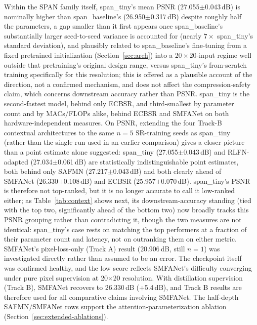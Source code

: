 \documentclass[pdflatex,sn-vancouver-num]{sn-jnl}
\begin{document}
Within the SPAN family itself, span\_tiny's mean PSNR (27.055$\pm$0.043\,dB) is nominally higher than span\_baseline's (26.950$\pm$0.317\,dB) despite roughly half the parameters, a gap smaller than it first appears once span\_baseline's substantially larger seed-to-seed variance is accounted for (nearly $7\times$ span\_tiny's standard deviation), and plausibly related to span\_baseline's fine-tuning from a fixed pretrained initialization (Section~\ref{sec:arch}) into a $20\times20$-input regime well outside that pretraining's original design range, versus span\_tiny's from-scratch training specifically for this resolution; this is offered as a plausible account of the direction, not a confirmed mechanism, and does not affect the compression-safety claim, which concerns downstream accuracy rather than PSNR. span\_tiny is the second-fastest model, behind only ECBSR, and third-smallest by parameter count and by MACs/FLOPs alike, behind ECBSR and SMFANet on both hardware-independent measures. On PSNR, extending the four Track-B contextual architectures to the same $n=5$ SR-training seeds as span\_tiny (rather than the single run used in an earlier comparison) gives a closer picture than a point estimate alone suggested: span\_tiny (27.055$\pm$0.043\,dB) and RLFN-adapted (27.034$\pm$0.061\,dB) are statistically indistinguishable point estimates, both behind only SAFMN (27.217$\pm$0.043\,dB) and both clearly ahead of SMFANet (26.330$\pm$0.108\,dB) and ECBSR (25.957$\pm$0.070\,dB). span\_tiny's PSNR is therefore not top-ranked, but it is no longer accurate to call it low-ranked either; as Table~\ref{tab:context} shows next, its downstream-accuracy standing (tied with the top two, significantly ahead of the bottom two) now broadly tracks this PSNR grouping rather than contradicting it, though the two measures are not identical: span\_tiny's case rests on matching the top performers at a fraction of their parameter count and latency, not on outranking them on either metric. SMFANet's pixel-loss-only (Track A) result (20.906\,dB, still $n=1$) was investigated directly rather than assumed to be an error. The checkpoint itself was confirmed healthy, and the low score reflects SMFANet's difficulty converging under pure pixel supervision at 20$\times$20 resolution. With distillation supervision (Track B), SMFANet recovers to 26.330\,dB (+5.4\,dB), and Track B results are therefore used for all comparative claims involving SMFANet. The half-depth SAFMN/SMFANet rows support the attention-parameterization ablation (Section~\ref{sec:extended-ablations}).
\end{document}

